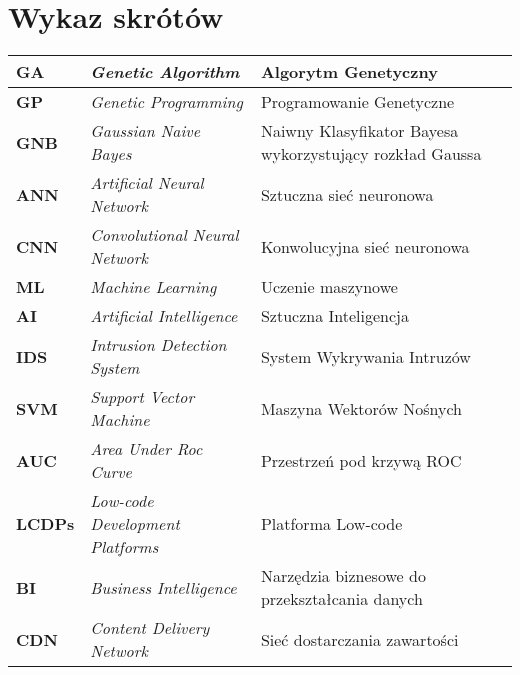 \section*{Wykaz skrótów}

\begin{table}[H]
    \centering
    \begin{tabularx}{\linewidth}{lXX}
        \textbf{GA} & \textit{Genetic Algorithm} & Algorytm Genetyczny \\ \hline
        \textbf{GP} & \textit{Genetic Programming} & Programowanie Genetyczne \\ \hline
        \textbf{GNB} & \textit{Gaussian Naive Bayes} & Naiwny Klasyfikator Bayesa wykorzystujący rozkład Gaussa \\ \hline
        \textbf{ANN} & \textit{Artificial Neural Network} & Sztuczna sieć neuronowa \\ \hline
        \textbf{CNN} & \textit{Convolutional Neural Network} & Konwolucyjna sieć neuronowa \\ \hline
        \textbf{ML} & \textit{Machine Learning} & Uczenie maszynowe \\ \hline
        \textbf{AI} & \textit{Artificial Intelligence} & Sztuczna Inteligencja \\ \hline
        \textbf{IDS} & \textit{Intrusion Detection System} & System Wykrywania Intruzów \\ \hline
        \textbf{SVM} & \textit{Support Vector Machine} & Maszyna Wektorów Nośnych \\ \hline
        \textbf{AUC} & \textit{Area Under Roc Curve} & Przestrzeń pod krzywą ROC \\ \hline
        \textbf{LCDPs} & \textit{Low-code Development Platforms} & Platforma Low-code \\ \hline
        \textbf{BI} & \textit{Business Intelligence} & Narzędzia biznesowe do przekształcania danych \\ \hline
        \textbf{CDN} & \textit{Content Delivery Network} & Sieć dostarczania zawartości \\ \hline
    \end{tabularx}
    \label{tab:shorts}
\end{table}